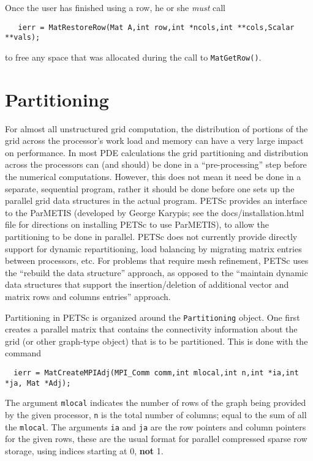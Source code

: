 Once the user has finished using a row, he or she {\em must} call 
\begin{verbatim}
   ierr = MatRestoreRow(Mat A,int row,int *ncols,int **cols,Scalar **vals);
\end{verbatim}
to free any space that was allocated during the call to {\tt MatGetRow()}.

\section{Partitioning}
\label{sec:partitioning}  

For almost all unstructured grid computation, the distribution of portions of 
the grid across the processor's work load and memory can have a very large
impact on performance. In most PDE calculations the grid partitioning and 
distribution across the processors can (and should) be done in a ``pre-processing'' step
before the numerical computations. However, this does not mean it need be done
in a separate, sequential program, rather it should be done before one sets up the 
parallel grid data structures in the actual program. PETSc provides an interface to
the ParMETIS (developed by George Karypis; see the docs/installation.html file
for directions on installing PETSc to use ParMETIS), to allow the partitioning to be done in
parallel. PETSc does not currently provide directly support for dynamic
repartitioning, load balancing by migrating matrix entries between processors, etc.
For problems that require mesh refinement, PETSc uses the ``rebuild the data structure''
approach, as opposed to the ``maintain dynamic data structures that support the 
insertion/deletion of additional vector and matrix rows and columns entries'' approach.

Partitioning in PETSc is organized around the {\tt Partitioning} object. 
One first creates a parallel matrix that contains the connectivity information about the 
grid (or other graph-type object) that is to be partitioned. This is done with the 
command
\begin{verbatim}
  ierr = MatCreateMPIAdj(MPI_Comm comm,int mlocal,int n,int *ia,int *ja, Mat *Adj);
\end{verbatim}
The argument {\tt mlocal} indicates the number of rows of the graph being provided
by the given processor, {\tt n} is the total number of columns; equal to the 
sum of all the {\tt mlocal}. The arguments {\tt ia} and {\tt ja} are the row pointers
and column pointers for the given rows, these are the usual format for parallel 
compressed sparse row storage, using indices starting at 0, {\bf not} 1.

